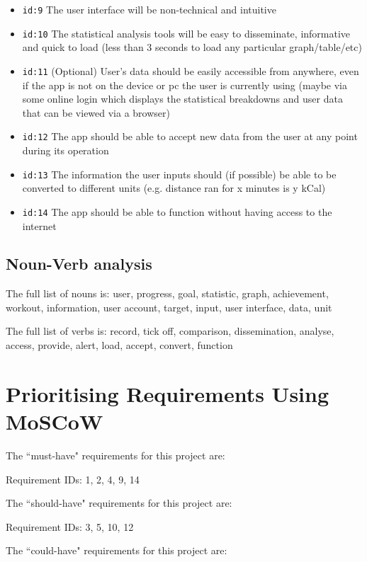 \documentclass{article}
\begin{document}
\begin{itemize}

	\item \verb!id:9! The user interface will be non-technical and intuitive
	\item \verb!id:10! The statistical analysis tools will be easy to disseminate, informative and quick to load (less than 3 seconds to load any particular graph/table/etc)
	\item \verb!id:11! (Optional) User's data should be easily accessible from anywhere, even if the app is not on the device or pc the user is currently using (maybe via some online login which displays the statistical breakdowns and user data that can be viewed via a browser)
	\item \verb!id:12! The app should be able to accept new data from the user at any point during its operation
	\item \verb!id:13! The information the user inputs should (if possible) be able to be converted to different units (e.g. distance ran for x minutes is y kCal)
	\item \verb!id:14! The app should be able to function without having access to the internet

\end{itemize}

\subsection{Noun-Verb analysis}

The full list of nouns is: user, progress, goal, statistic, graph, achievement, workout, information, user account, target, input, user interface, data, unit

The full list of verbs is: record, tick off, comparison, dissemination, analyse, access, provide, alert, load, accept, convert, function

\section{Prioritising Requirements Using MoSCoW}

The ``must-have" requirements for this project are:

Requirement IDs: 1, 2, 4, 9, 14

The ``should-have" requirements for this project are:

Requirement IDs: 3, 5, 10, 12

The ``could-have" requirements for this project are:
\end{document}
